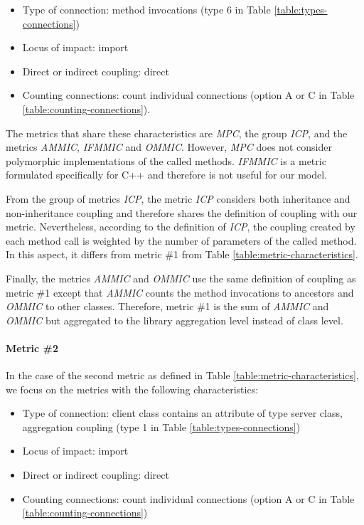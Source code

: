 \begin{itemize}
  \item Type of connection: method invocations (type 6 in Table \ref{table:types-connections})
  \item Locus of impact: import
  \item Direct or indirect coupling: direct
  \item Counting connections: count individual connections (option A or C in Table \ref{table:counting-connections}).
\end{itemize}

The metrics that share these characteristics are \textit{MPC}, the group \textit{ICP}, and the metrics \textit{AMMIC}, \textit{IFMMIC} and \textit{OMMIC}. However, \textit{MPC} does not consider polymorphic implementations of the called methods. \textit{IFMMIC} is a metric formulated specifically for C++ \cite{briand1997investigation} and therefore is not useful for our model.

From the group of metrics \textit{ICP}, the metric \textit{ICP}  considers both inheritance and non-inheritance coupling and therefore shares the definition of coupling with our metric. Nevertheless, according to the definition of \textit{ICP}, the coupling created by each method call is weighted by the number of parameters of the called method. In this aspect, it differs from metric \#1 from Table \ref{table:metric-characteristics}.

Finally, the metrics \textit{AMMIC} and \textit{OMMIC} use the same definition of coupling as metric \#1 except that \textit{AMMIC} counts the method invocations to ancestors and \textit{OMMIC} to other classes. Therefore, metric \#1 is the sum of \textit{AMMIC} and \textit{OMMIC} but aggregated to the library aggregation level instead of class level.

\paragraph{Metric \#2}
In the case of the second metric as defined in Table \ref{table:metric-characteristics}, we focus on the metrics with the following characteristics:

\begin{itemize}
  \item Type of connection: client class contains an attribute of type server class, aggregation coupling (type 1 in Table \ref{table:types-connections})
  \item Locus of impact: import
  \item Direct or indirect coupling: direct
  \item Counting connections: count individual connections (option A or C in Table \ref{table:counting-connections})
\end{itemize}

